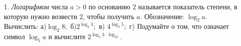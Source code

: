 1. {\it Логарифмом} числа $a>0$ по основанию 2 называется показатель степени, в которую нужно возвести 2, чтобы получить $a.$ Обозначение: $\log_2 a.$\\
Вычислить: а)$\log_2 8;$ б)$2^{\log_2 3};$ в) $4^{\log_2 5};$ г) Подумайте о том, что означает символ $\log_5 a$ и вычислите $2^{\log_5 3\cdot\log_25}.$\\
